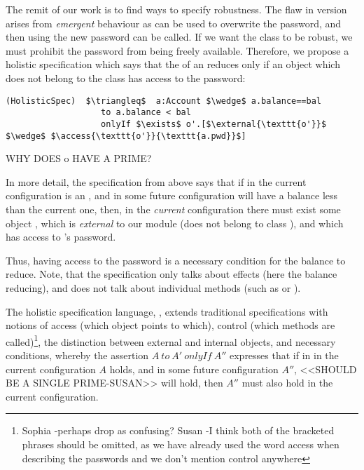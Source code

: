  
 The remit of our work is to find ways to specify robustness. 
 The flaw in version {} arises from \emph{emergent} behaviour as  
 can be used to overwrite the
 password, and then using the new password   can be called.
 If we want the  class to be robust, we must prohibit the password from being freely available.
 Therefore, we propose a holistic specification which says that
 the  of an  reduces only if an object which does not belong to the
 class  has access to the password:
 
 \begin{lstlisting}[language = Chainmail, mathescape=true, frame=lines]
(HolisticSpec)  $\triangleq$  a:Account $\wedge$ a.balance==bal
                   to a.balance < bal
                   onlyIf $\exists$ o'.[$\external{\texttt{o'}}$ $\wedge$ $\access{\texttt{o'}}{\texttt{a.pwd}}$]
\end{lstlisting}
 
 WHY DOES o HAVE A PRIME?
 
 In more detail, the specification from above says that if in the current
 configuration  is an ,
 and in some future configuration  will have a balance less than the current one, then, in the \emph{current} configuration
 there must exist some object , which is \emph{external} to our module (does not belong to class
 ), and which has access to 's password.
 
 
 Thus, having access to the password is a necessary condition for the balance to reduce.
 Note, that the specification only talks about effects (here the balance reducing), and does not
 talk about individual methods (such as  or ).
 

 The holistic specification language, \Chainmail, extends traditional specifications with
notions of access (which object points to which), control (which methods are called)\footnote{Sophia -perhaps drop as confusing? Susan -I think both of the bracketed phrases should be omitted, as we have already used the word access when describing the passwords and we don't mention control anywhere}, 
 the distinction between external and internal objects, and necessary conditions, 
 whereby the assertion $A~to~A'~onlyIf~A''$ expresses that if in in the current configuration
 $A$ holds, and in some future configuration $A''$, <<SHOULD BE A SINGLE PRIME-SUSAN>> will hold, then $A''$ must also hold in the 
 current configuration.  
 
